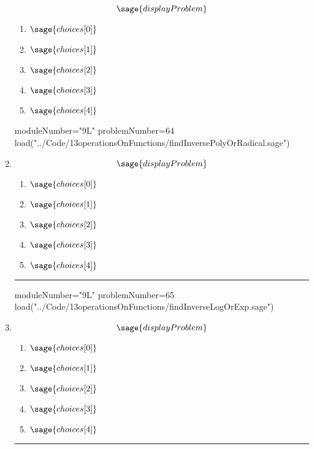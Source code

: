 \documentclass[14pt]{extbook}
\newcommand{\litem}[1]{\item#1\hspace*{-1cm}\rule{\textwidth}{0.4pt}}
\begin{document}
\begin{enumerate}
{   \[ \sage{displayProblem} \]

  	\begin{enumerate}[label=\Alph*.]
    \item \( \sage{choices[0]} \)
    \item \( \sage{choices[1]} \)
    \item \( \sage{choices[2]} \)
    \item \( \sage{choices[3]} \)
    \item \( \sage{choices[4]} \)
  	\end{enumerate}
  }
\begin{sagesilent}
moduleNumber="9L"
problemNumber=64
load("../Code/13operationsOnFunctions/findInversePolyOrRadical.sage")
\end{sagesilent}

\litem{ 

   \[ \sage{displayProblem} \]

  	\begin{enumerate}[label=\Alph*.]
    \item \( \sage{choices[0]} \)
    \item \( \sage{choices[1]} \)
    \item \( \sage{choices[2]} \)
    \item \( \sage{choices[3]} \)
    \item \( \sage{choices[4]} \)
  	\end{enumerate}
  }
\begin{sagesilent}
moduleNumber="9L"
problemNumber=65
load("../Code/13operationsOnFunctions/findInverseLogOrExp.sage")
\end{sagesilent}

\litem{ 

   \[ \sage{displayProblem} \]

  	\begin{enumerate}[label=\Alph*.]
    \item \( \sage{choices[0]} \)
    \item \( \sage{choices[1]} \)
    \item \( \sage{choices[2]} \)
    \item \( \sage{choices[3]} \)
    \item \( \sage{choices[4]} \)
  	\end{enumerate}
  }

\end{enumerate}
\end{document}
